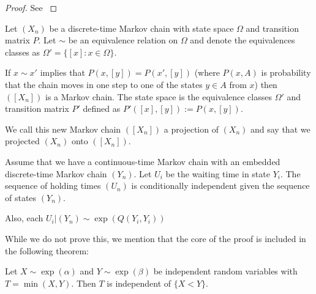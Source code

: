 \begin{proof}
See \cite{grinstead2003}
\end{proof}

\begin{theorem}\label{thm:mc_projection} \cite{LevinPeresWilmer2006}
Let $(X_n)$ be a discrete-time Markov chain with state space $\Omega$ and transition matrix $P$.
Let $\sim$ be an equivalence relation on $\Omega$ and denote the equivalences classes as $\Omega' = \{[x]: x \in \Omega\}$.

If $x \sim x'$ implies that $P(x,[y]) = P(x', [y])$ (where $P(x,A)$ is probability that the chain moves in one step to one of the states $y \in A$ from $x$) then $([X_n])$  is a Markov chain.
The state space is the equivalence classes $\Omega'$ and transition matrix $P'$ defined as $P'([x],[y]) := P(x, [y])$.

We call this new Markov chain $([X_n])$ a projection of $(X_n)$ and say that we projected $(X_n)$ onto $([X_n])$.
\end{theorem}

\begin{theorem}\label{thm:x_N_indep}
Assume that we have a continuous-time Markov chain with an embedded discrete-time Markov chain $(Y_n)$.
Let $U_i$ be the waiting time in state $Y_i$.
The sequence of holding times $(U_n)$ is conditionally independent given the sequence of states $(Y_n)$.

Also, each $U_i | (Y_n) \sim \exp(Q(Y_i,Y_i))$
\end{theorem}

While we do not prove this, we mention that the core of the proof is included in the following theorem:

\begin{theorem}
Let $X \sim \exp(\alpha)$ and $Y \sim \exp(\beta)$ be independent random variables with $T = \min(X,Y)$.
Then $T$ is independent of $\{X < Y\}$.
\end{theorem}

